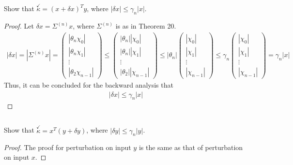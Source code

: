 \documentclass[11pt,a4paper]{article}
\begin{document}
\section{}
\subsection{}
Show that $\overset{\checkmark}{\kappa} = (x + \delta x)^T y$, where $|\delta x| \leq \gamma_n |x|$. 
\begin{proof}
    Let $\delta x = \Sigma^{(n)} x$, where $\Sigma^{(n)}$ is as in Theorem 20.     
    \begin{align}
        |\delta x| = |\Sigma^{(n)} x| 
         = \left(\begin{array}{c} |\theta_n\chi_0| \\ |\theta_n\chi_1| \\ \vdots \\ |\theta_2\chi_{n-1}| \end{array} \right)
         \leq \left(\begin{array}{c} |\theta_n||\chi_0| \\ |\theta_n||\chi_1| \\ \vdots \\ |\theta_2||\chi_{n-1}| \end{array} \right)
         \leq |\theta_n| \left(\begin{array}{c} |\chi_0| \\ |\chi_1| \\ \vdots \\ |\chi_{n-1}| \end{array} \right)
         \leq \gamma_n \left(\begin{array}{c} |\chi_0| \\ |\chi_1| \\ \vdots \\ |\chi_{n-1}| \end{array} \right)
         = \gamma_n |x|
    \end{align}
    Thus, it can be concluded for the backward analysis that 
    \begin{align}
        |\delta x| \leq \gamma_n |x|
    \end{align}
\end{proof}

\subsection{}
Show that $\overset{\checkmark}{\kappa} = x^T (y+\delta y)$, where $|\delta y| \leq \gamma_n |y|$. 
\begin{proof}
    The proof for perturbation on input $y$ is the same as that of perturbation
    on input $x$.
\end{proof}
\end{document}
